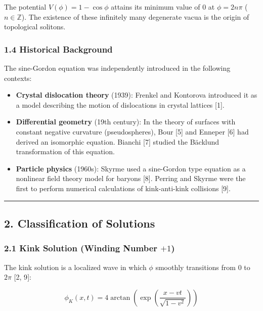 \documentclass[a4paper,11pt]{article}
\providecommand{\tightlist}{\setlength{\itemsep}{0pt}\setlength{\parskip}{0pt}}
\begin{document}
The potential \(V(\phi) = 1 - \cos\phi\) attains its minimum value of 0
at \(\phi = 2n\pi\) (\(n \in \mathbb{Z}\)). The existence of these
infinitely many degenerate vacua is the origin of topological solitons.

\subsubsection{1.4 Historical Background}\label{historical-background}

The sine-Gordon equation was independently introduced in the following
contexts:

\begin{itemize}
\tightlist
\item
  \textbf{Crystal dislocation theory} (1939): Frenkel and Kontorova
  introduced it as a model describing the motion of dislocations in
  crystal lattices {[}1{]}.
\item
  \textbf{Differential geometry} (19th century): In the theory of
  surfaces with constant negative curvature (pseudospheres), Bour
  {[}5{]} and Enneper {[}6{]} had derived an isomorphic equation.
  Bianchi {[}7{]} studied the Bäcklund transformation of this equation.
\item
  \textbf{Particle physics} (1960s): Skyrme used a sine-Gordon type
  equation as a nonlinear field theory model for baryons {[}8{]}.
  Perring and Skyrme were the first to perform numerical calculations of
  kink-anti-kink collisions {[}9{]}.
\end{itemize}

\begin{center}\rule{0.5\linewidth}{0.5pt}\end{center}

\subsection{2. Classification of
Solutions}\label{classification-of-solutions}

\subsubsection{\texorpdfstring{2.1 Kink Solution (Winding Number
\(+1\))}{2.1 Kink Solution (Winding Number +1)}}\label{kink-solution-winding-number-1}

The kink solution is a localized wave in which \(\phi\) smoothly
transitions from \(0\) to \(2\pi\) {[}2, 9{]}:

\[\phi_K(x, t) = 4\arctan\left(\exp\left(\frac{x - vt}{\sqrt{1 - v^2}}\right)\right)\]
\end{document}

